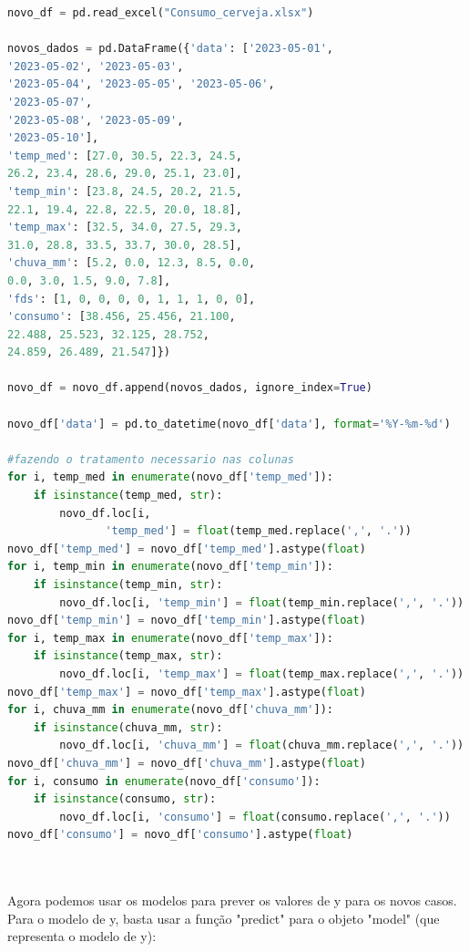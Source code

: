 \documentclass[a4paper, 12pt]{article}
\begin{document}
\begin{tcolorbox}[colback=white,boxrule=1pt,arc=5pt,auto outer arc]
  \begin{lstlisting}[language=Python]
novo_df = pd.read_excel("Consumo_cerveja.xlsx")

novos_dados = pd.DataFrame({'data': ['2023-05-01', 
'2023-05-02', '2023-05-03', 
'2023-05-04', '2023-05-05', '2023-05-06', 
'2023-05-07', 
'2023-05-08', '2023-05-09', 
'2023-05-10'],
'temp_med': [27.0, 30.5, 22.3, 24.5, 
26.2, 23.4, 28.6, 29.0, 25.1, 23.0],
'temp_min': [23.8, 24.5, 20.2, 21.5, 
22.1, 19.4, 22.8, 22.5, 20.0, 18.8],
'temp_max': [32.5, 34.0, 27.5, 29.3, 
31.0, 28.8, 33.5, 33.7, 30.0, 28.5],
'chuva_mm': [5.2, 0.0, 12.3, 8.5, 0.0, 
0.0, 3.0, 1.5, 9.0, 7.8],
'fds': [1, 0, 0, 0, 0, 1, 1, 1, 0, 0], 
'consumo': [38.456, 25.456, 21.100, 
22.488, 25.523, 32.125, 28.752, 
24.859, 26.489, 21.547]})

novo_df = novo_df.append(novos_dados, ignore_index=True)

novo_df['data'] = pd.to_datetime(novo_df['data'], format='%Y-%m-%d')

#fazendo o tratamento necessario nas colunas
for i, temp_med in enumerate(novo_df['temp_med']):
    if isinstance(temp_med, str):
        novo_df.loc[i, 
               'temp_med'] = float(temp_med.replace(',', '.'))
novo_df['temp_med'] = novo_df['temp_med'].astype(float)
for i, temp_min in enumerate(novo_df['temp_min']):
    if isinstance(temp_min, str):
        novo_df.loc[i, 'temp_min'] = float(temp_min.replace(',', '.'))
novo_df['temp_min'] = novo_df['temp_min'].astype(float)
for i, temp_max in enumerate(novo_df['temp_max']):
    if isinstance(temp_max, str):
        novo_df.loc[i, 'temp_max'] = float(temp_max.replace(',', '.'))
novo_df['temp_max'] = novo_df['temp_max'].astype(float)
for i, chuva_mm in enumerate(novo_df['chuva_mm']):
    if isinstance(chuva_mm, str):
        novo_df.loc[i, 'chuva_mm'] = float(chuva_mm.replace(',', '.'))
novo_df['chuva_mm'] = novo_df['chuva_mm'].astype(float)
for i, consumo in enumerate(novo_df['consumo']):
    if isinstance(consumo, str):
        novo_df.loc[i, 'consumo'] = float(consumo.replace(',', '.'))
novo_df['consumo'] = novo_df['consumo'].astype(float)



    \end{lstlisting}
\end{tcolorbox} \\


Agora podemos usar os modelos para prever os valores de y para os novos casos. Para o modelo de y, basta usar a função "predict" para o objeto "model" (que representa o modelo de y):
\end{document}
